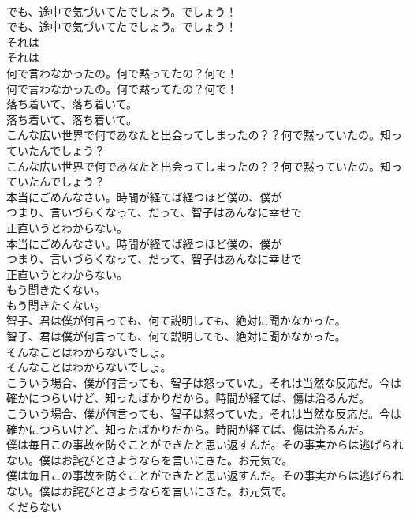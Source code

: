 \documentclass[8pt]{extreport}
\begin{document}
\begin{CJK}{UTF8}{min}
\\	でも、途中で気づいてたでしょう。でしょう！	
\\	でも、途中で気づいてたでしょう。でしょう！ 
\\	それは
\\	それは
\\	何で言わなかったの。何で黙ってたの？何で！	
\\	何で言わなかったの。何で黙ってたの？何で！ 
\\	落ち着いて、落ち着いて。	
\\	落ち着いて、落ち着いて。 
\\	こんな広い世界で何であなたと出会ってしまったの？？何で黙っていたの。知っていたんでしょう？	
\\	こんな広い世界で何であなたと出会ってしまったの？？何で黙っていたの。知っていたんでしょう？ 
\\	本当にごめんなさい。時間が経てば経つほど僕の、僕が
\\	つまり、言いづらくなって、だって、智子はあんなに幸せで
\\	正直いうとわからない。	
\\	本当にごめんなさい。時間が経てば経つほど僕の、僕が
\\	つまり、言いづらくなって、だって、智子はあんなに幸せで
\\	正直いうとわからない。 
\\	もう聞きたくない。	
\\	もう聞きたくない。 
\\	智子、君は僕が何言っても、何て説明しても、絶対に聞かなかった。	
\\	智子、君は僕が何言っても、何て説明しても、絶対に聞かなかった。 
\\	そんなことはわからないでしょ。	
\\	そんなことはわからないでしょ。 
\\	こういう場合、僕が何言っても、智子は怒っていた。それは当然な反応だ。今は確かにつらいけど、知ったばかりだから。時間が経てば、傷は治るんだ。	
\\	こういう場合、僕が何言っても、智子は怒っていた。それは当然な反応だ。今は確かにつらいけど、知ったばかりだから。時間が経てば、傷は治るんだ。 
\\	僕は毎日この事故を防ぐことができたと思い返すんだ。その事実からは逃げられない。僕はお詫びとさようならを言いにきた。お元気で。	
\\	僕は毎日この事故を防ぐことができたと思い返すんだ。その事実からは逃げられない。僕はお詫びとさようならを言いにきた。お元気で。 
\\	くだらない

\end{CJK}
\end{document}
